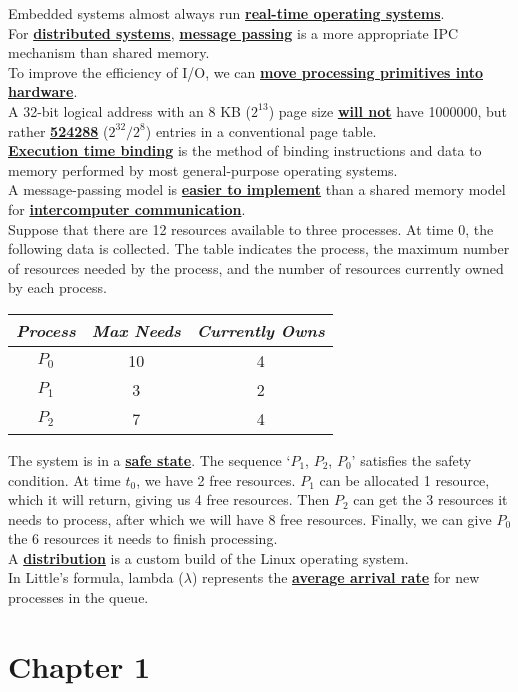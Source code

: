 \documentclass[10pt]{article}
\newcommand{\qw}[1]{\textbf{\ul{#1}}}
\begin{document}
Embedded systems almost always run \qw{real-time operating systems}.\\[2mm]
For \qw{distributed systems}, \qw{message passing} is a more appropriate IPC mechanism than shared memory.\\[2mm]
To improve the efficiency of I/O, we can \qw{move processing primitives into hardware}.\\[2mm]
A 32-bit logical address with an 8 KB ($2^13$) page size \qw{will not} have 1000000, but rather \qw{524288} ($2^{32}/2^8$) entries in a conventional page table.\\[2mm]
\qw{Execution time binding} is the method of binding instructions and data to memory performed by most general-purpose operating systems.\\[2mm]
A message-passing model is \qw{easier to implement} than a shared memory model for \qw{intercomputer communication}.\\[2mm]
Suppose that there are 12 resources available to three processes. At time 0, the following data is collected. The table indicates the process, the maximum number of resources needed by the process, and the number of resources currently owned by each process.\\
\begin{table}[h]
\centering
\begin{tabular}{ccc}
\textit{Process} & \textit{Max Needs} & \textit{Currently Owns} \\ \hline
$P_0$ & 10 & 4 \\
$P_1$ & 3 & 2 \\
$P_2$ & 7 & 4
\end{tabular}
\end{table}
The system is in a \qw{safe state}. The sequence `$P_1$, $P_2$, $P_0$' satisfies the safety condition.
At time $t_0$, we have 2 free resources. $P_1$ can be allocated 1 resource, 
which it will return, giving us 4 free resources. Then $P_2$ can get the 3 resources it needs to process,
after which we will have 8 free resources. Finally, we can give $P_0$ the 6 resources it needs to finish processing.\\[2mm]
A \qw{distribution} is a custom build of the Linux operating system.\\[2mm]
In Little's formula, lambda ($\lambda$) represents the \qw{average arrival rate} for new processes in the queue.\\[2mm]

\section{Chapter 1}\newpage
\end{document}
